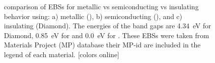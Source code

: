 \documentclass[article]{elsarticle}
\begin{document}
\begin{figure}[H]
    \centering
        
        
    \caption{comparison of EBSs for metallic vs semiconducting vs insulating behavior using: a) metallic (), b) semiconducting (), and c) insulating (Diamond). The energies of the band gaps are \SI{4.34}{\electronvolt} for Diamond,  \SI{0.85}{\electronvolt} for  and \SI{0.0}{\electronvolt} for . These EBSs were taken from Materials Project (MP) database \cite{Jain2013,jain2013commentary,ong2015materials} their MP-id are included in the legend of each material. [colors online]}
    \label{fig:EBS_classical}
\end{figure}
\end{document}
